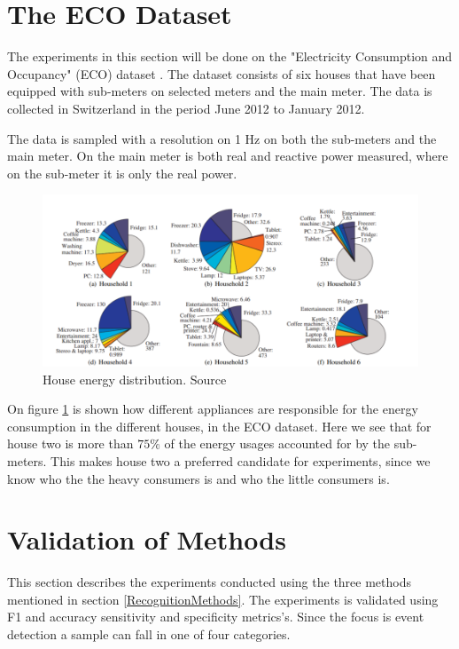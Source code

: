 \section{The ECO Dataset}
The experiments in this section will be done on the "Electricity Consumption and Occupancy" (ECO) dataset \citep{RefWorks:26}\citep{RefWorks:27}. The dataset consists of six houses that have been equipped with sub-meters on selected meters and the main meter. The data is collected in Switzerland in the period June 2012 to January 2012. 

The data is sampled with a resolution on 1 Hz on both the sub-meters and the main meter. On the main meter is both real and reactive power measured, where on the sub-meter it is only the real power. 

\begin{figure}[H]
\centering
\includegraphics[width=1\textwidth]{billeder/ECOHouses.png}
\caption{House energy distribution. Source \citep{RefWorks:26}}
\label{fig:EHD}
\end{figure}

On figure \ref{fig:EHD} is shown how different appliances are responsible for the energy consumption in the different houses, in the ECO dataset. Here we see that for house two is more than $75\%$ of the energy usages accounted for by the sub-meters. This makes house two a preferred candidate for experiments, since we know who the the heavy consumers is and who the little consumers is.  

\section{Validation of Methods} 
This section describes the experiments conducted using the three methods mentioned in section \ref{RecognitionMethods}. The experiments is validated using F1 and accuracy sensitivity and specificity metrics's. Since the focus is event detection a sample can fall in one of four categories. 

